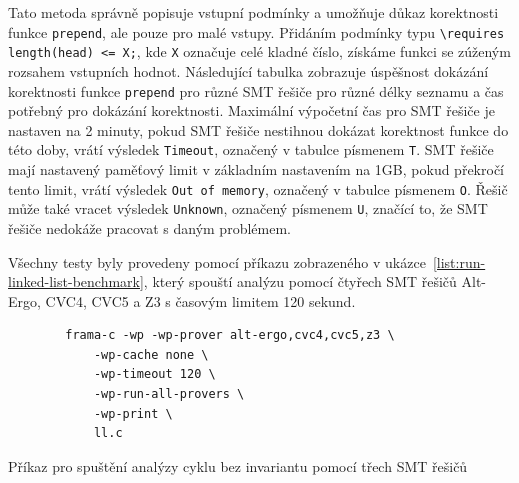 Tato metoda správně popisuje vstupní podmínky a umožňuje důkaz korektnosti funkce \texttt{prepend},
ale pouze pro malé vstupy.
Přidáním podmínky typu \texttt{\textbackslash requires length(head) <= X;},
kde \texttt{X} označuje celé kladné číslo,
získáme funkci se zúženým rozsahem vstupních hodnot.
Následující tabulka zobrazuje úspěšnost dokázání korektnosti funkce \texttt{prepend}
pro různé SMT řešiče pro různé délky seznamu a čas potřebný pro dokázání korektnosti.
Maximální výpočetní čas pro SMT řešiče je nastaven na 2 minuty, pokud SMT řešiče
nestihnou dokázat korektnost funkce do této doby, vrátí výsledek \texttt{Timeout},
označený v tabulce písmenem \texttt{T}.
SMT řešiče mají nastavený paměťový limit v základním nastavením na 1GB, pokud překročí tento limit,
vrátí výsledek \texttt{Out of memory}, označený v tabulce písmenem \texttt{O}.
Řešič může také vracet výsledek \texttt{Unknown}, označený písmenem \texttt{U},
značící to, že SMT řešiče nedokáže pracovat s daným problémem.

Všechny testy byly provedeny pomocí příkazu zobrazeného v ukázce~\ref{list:run-linked-list-benchmark},
který spouští analýzu pomocí čtyřech SMT řešičů Alt-Ergo, CVC4, CVC5 a Z3 s časovým limitem 120 sekund.

\begin{listing}[H]
    \begin{verbatim}
        frama-c -wp -wp-prover alt-ergo,cvc4,cvc5,z3 \
            -wp-cache none \
            -wp-timeout 120 \
            -wp-run-all-provers \
            -wp-print \
            ll.c
    \end{verbatim}
    \caption{Příkaz pro spuštění analýzy cyklu bez invariantu pomocí třech SMT řešičů}
    \label{list:run-linked-list-benchmark}
\end{listing}

